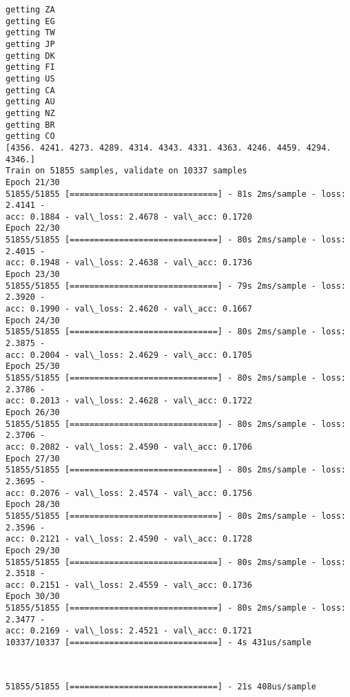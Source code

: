 \documentclass[11pt]{article}
\begin{document}
    \begin{Verbatim}[commandchars=\\\{\}]
getting ZA
getting EG
getting TW
getting JP
getting DK
getting FI
getting US
getting CA
getting AU
getting NZ
getting BR
getting CO
[4356. 4241. 4273. 4289. 4314. 4343. 4331. 4363. 4246. 4459. 4294. 4346.]
Train on 51855 samples, validate on 10337 samples
Epoch 21/30
51855/51855 [==============================] - 81s 2ms/sample - loss: 2.4141 -
acc: 0.1884 - val\_loss: 2.4678 - val\_acc: 0.1720
Epoch 22/30
51855/51855 [==============================] - 80s 2ms/sample - loss: 2.4015 -
acc: 0.1948 - val\_loss: 2.4638 - val\_acc: 0.1736
Epoch 23/30
51855/51855 [==============================] - 79s 2ms/sample - loss: 2.3920 -
acc: 0.1990 - val\_loss: 2.4620 - val\_acc: 0.1667
Epoch 24/30
51855/51855 [==============================] - 80s 2ms/sample - loss: 2.3875 -
acc: 0.2004 - val\_loss: 2.4629 - val\_acc: 0.1705
Epoch 25/30
51855/51855 [==============================] - 80s 2ms/sample - loss: 2.3786 -
acc: 0.2013 - val\_loss: 2.4628 - val\_acc: 0.1722
Epoch 26/30
51855/51855 [==============================] - 80s 2ms/sample - loss: 2.3706 -
acc: 0.2082 - val\_loss: 2.4590 - val\_acc: 0.1706
Epoch 27/30
51855/51855 [==============================] - 80s 2ms/sample - loss: 2.3695 -
acc: 0.2076 - val\_loss: 2.4574 - val\_acc: 0.1756
Epoch 28/30
51855/51855 [==============================] - 80s 2ms/sample - loss: 2.3596 -
acc: 0.2121 - val\_loss: 2.4590 - val\_acc: 0.1728
Epoch 29/30
51855/51855 [==============================] - 80s 2ms/sample - loss: 2.3518 -
acc: 0.2151 - val\_loss: 2.4559 - val\_acc: 0.1736
Epoch 30/30
51855/51855 [==============================] - 80s 2ms/sample - loss: 2.3477 -
acc: 0.2169 - val\_loss: 2.4521 - val\_acc: 0.1721
10337/10337 [==============================] - 4s 431us/sample
    \end{Verbatim}

    \begin{center}
    \end{center}
    { \hspace*{\fill} \\}
    
    \begin{Verbatim}[commandchars=\\\{\}]
51855/51855 [==============================] - 21s 408us/sample
    \end{Verbatim}

    \begin{center}
    \end{center}
    { \hspace*{\fill} \\}
    
\end{document}
